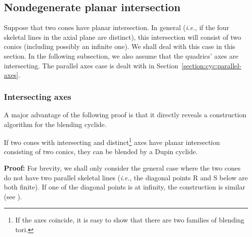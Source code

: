 
\subsection{Nondegenerate planar intersection}
\label{ssection:nondegn}

Suppose that two cones have planar intersection.  
In general ({\em i.e.}, if the four skeletal lines in the axial plane
are distinct), this intersection will consist of two conics
(including possibly an infinite one).
We shall deal with this case in this section.  
In the following subsection, 
we also assume that the quadrics' axes are intersecting.
The parallel axes case is dealt with in 
Section~\ref{section:cyc:parallel-axes}.

\subsubsection{Intersecting axes}
\label{section:intersecting-axes}

A major advantage of the following proof is that it directly reveals
a construction algorithm for the blending cyclide.

\begin{lemma}
\label{lemma:int-cyclide}
If two cones with intersecting and distinct\footnote{If the axes coincide, 
	it is easy to show that there are two families of
	blending tori.}
axes have planar intersection consisting of two conics, they can be blended
by a Dupin cyclide.
\end{lemma}
{\bf Proof:}
For brevity, we shall only consider the general case where the two cones
do not have two parallel skeletal lines
({\em i.e.}, the diagonal points R and S below are both finite).
If one of the diagonal points is at infinity, the construction is similar
(see \cite[Lemma~5.13]{shenethesis}).

